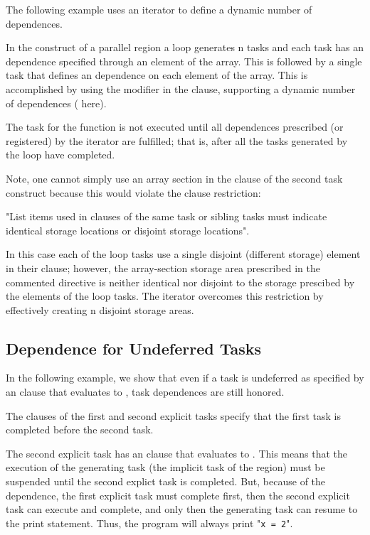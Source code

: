 The following example uses an iterator to define a dynamic number of
dependences.

In the  construct of a parallel region a loop generates n tasks
and each task has an  dependence specified through an element of
the  array.  This is followed by a single task that defines an 
dependence on each element of the array.  This is accomplished by
using the  modifier in the  clause, supporting a dynamic number
of dependences ( here).

The task for the  function is not executed until all dependences
prescribed (or registered) by the iterator are fulfilled; that is,
after all the tasks generated by the loop have completed.

Note, one cannot simply use an array section in the  clause
of the second task construct because this would violate the  clause restriction:

"List items used in  clauses of the same task or sibling tasks
must indicate identical storage locations or disjoint storage locations".

In this case each of the loop tasks use a single disjoint (different storage)
element in their  clause; however,
the array-section storage area prescribed in the commented directive is neither
identical nor disjoint to the storage prescibed by the elements of the
loop tasks.  The iterator overcomes this restriction by effectively
creating n disjoint storage areas.



\subsection{Dependence for Undeferred Tasks}
\label{subsec:depend_undefer_task}

In the following example, we show that even if a task is undeferred as specified
by an  clause that evaluates to , task dependences are
still honored.

The  clauses of the first and second explicit tasks specify that
the first task is completed before the second task.

The second explicit task has an  clause that evaluates to .
This means that the execution of the generating task (the implicit task of
the  region) must be suspended until the second explict task
is completed.
But, because of the dependence, the first explicit task must complete first,
then the second explicit task can execute and complete, and only then 
the generating task can resume to the print statement.
Thus, the program will always print "\texttt{x = 2}".

\clearpage


